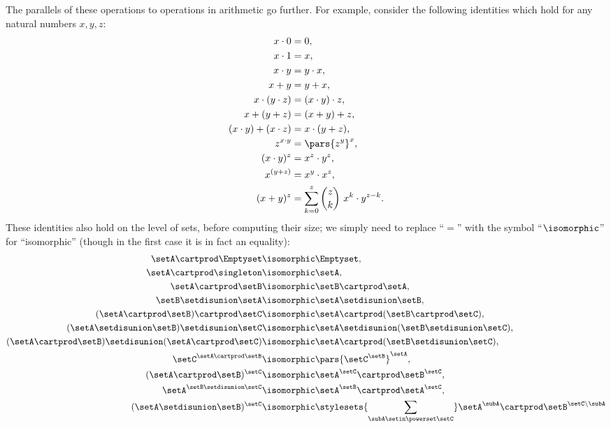 The parallels of these operations to operations in arithmetic go further.
For example, consider the following identities which hold for any natural numbers $x, y, z$: 
\begin{align}
    x \cdot 0 &= 0, \\
    x \cdot 1 &= x, \\
    x \cdot y & = y \cdot x,  \\ 
    x + y & = y + x, \\
    x \cdot (y \cdot z) & = (x \cdot y) \cdot z, \\
    x + (y + z) & = (x + y) + z, \\
    (x \cdot y) + (x \cdot z)  & = x \cdot (y + z), \\
    z^{x \cdot y}                    & = \pars{z^y}^x, \\
    (x \cdot y)^z &= x^z \cdot y^z, \\
    x^{(y + z)}           & = x^y \cdot x^z, \\
    (x + y)^z &= \sum_{k = 0}^z {{z}\choose{k}} \ x^k \cdot y^{z - k}. 
\end{align}
These identities also hold on the level of sets, before computing their size; we simply need to replace ``$=$'' with the symbol ``$\isomorphic$'' for ``isomorphic'' (though in the first case it is in fact an equality):
\begin{align}
    \setA \cartprod \Emptyset & \isomorphic \Emptyset,  \\
    \setA \cartprod \singleton & \isomorphic \setA,  \\
    \setA \cartprod \setB & \isomorphic \setB \cartprod \setA,  \\
    \setB \setdisunion \setA & \isomorphic \setA \setdisunion \setB,   \\
    (\setA \cartprod \setB) \cartprod \setC & \isomorphic \setA \cartprod (\setB \cartprod \setC), \\
    (\setA \setdisunion \setB) \setdisunion \setC & \isomorphic \setA \setdisunion (\setB \setdisunion \setC), \\
    (\setA \cartprod \setB) \setdisunion (\setA \cartprod \setC)  & \isomorphic \setA \cartprod (\setB \setdisunion \setC), \\
    \setC^{\setA \cartprod \setB}                    & \isomorphic \pars{\setC^\setB}^\setA, \\
    (\setA \cartprod \setB)^{\setC} & \isomorphic  \setA^\setC \cartprod \setB^\setC, \\
    \setA^{\setB \setdisunion \setC}           & \isomorphic \setA^\setB \cartprod \setA^\setC, \\
    (\setA \setdisunion \setB)^{\setC} & \isomorphic \stylesets{\sum_{\subA \setin \powerset \setC}} \setA^\subA \cartprod \setB^{\setC \backslash \subA} 
\end{align}

